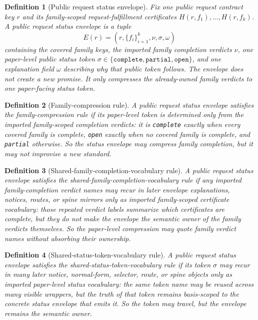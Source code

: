 \documentclass[11pt]{article}
\newtheorem{definition}{Definition}
\begin{document}
\begin{definition}[Public request status envelope]
Fix one public request contract key $r$ and its family-scoped request-fulfillment certificates $H(r,f_1),\dots,H(r,f_k)$.
A \emph{public request status envelope} is a tuple
\[
E(r)=(r,\{f_i\}_{i=1}^k,\nu,\sigma,\omega)
\]
containing the covered family keys, the imported family completion verdicts $\nu$, one paper-level public status token $\sigma\in\{\texttt{complete},\texttt{partial},\texttt{open}\}$, and one explanation field $\omega$ describing why that public token follows.
The envelope does not create a new promise.
It only compresses the already-owned family verdicts to one paper-facing status token.
\end{definition}

\begin{definition}[Family-compression rule]
A public request status envelope satisfies the \emph{family-compression rule} if its paper-level token is determined only from the imported family-scoped completion verdicts: it is \texttt{complete} exactly when every covered family is complete, \texttt{open} exactly when no covered family is complete, and \texttt{partial} otherwise.
So the status envelope may compress family completion, but it may not improvise a new standard.
\end{definition}

\begin{definition}[Shared-family-completion-vocabulary rule]
A public request status envelope satisfies the \emph{shared-family-completion-vocabulary rule} if any imported family-completion verdict names may recur in later envelope explanations, notices, routes, or spine mirrors only as imported family-scoped certificate vocabulary: those repeated verdict labels summarize which certificates are complete, but they do not make the envelope the semantic owner of the family verdicts themselves.
So the paper-level compression may quote family verdict names without absorbing their ownership.
\end{definition}

\begin{definition}[Shared-status-token-vocabulary rule]
A public request status envelope satisfies the \emph{shared-status-token-vocabulary rule} if its token $\sigma$ may recur in many later notice, normal-form, selector, route, or spine objects only as imported paper-level status vocabulary: the same token name may be reused across many visible wrappers, but the truth of that token remains basis-scoped to the concrete status envelope that emits it.
So the token may travel, but the envelope remains the semantic owner.
\end{definition}
\end{document}

